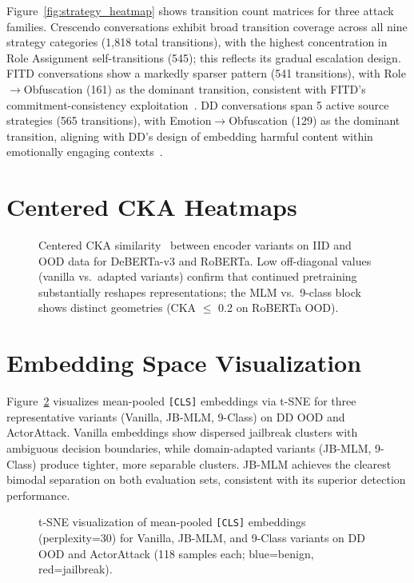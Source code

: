 Figure~\ref{fig:strategy_heatmap} shows transition count matrices for three attack families.
Crescendo conversations exhibit broad transition coverage across all nine strategy categories (1,818 total transitions), with the highest concentration in Role Assignment self-transitions (545); this reflects its gradual escalation design.
FITD conversations show a markedly sparser pattern (541 transitions), with Role$\to$Obfuscation (161) as the dominant transition, consistent with FITD's commitment-consistency exploitation~\citep{cialdini2001influence}.
DD conversations span 5 active source strategies (565 transitions), with Emotion$\to$Obfuscation (129) as the dominant transition, aligning with DD's design of embedding harmful content within emotionally engaging contexts~\citep{deceptivedelight2024}.

\section{Centered CKA Heatmaps}
\label{sec:cka_heatmap}

\begin{figure}[t]
\centering
\caption{Centered CKA similarity~\citep{kornblith2019cka} between encoder variants on IID and OOD data for DeBERTa-v3 and RoBERTa. Low off-diagonal values (vanilla vs.\ adapted variants) confirm that continued pretraining substantially reshapes representations; the MLM vs.\ 9-class block shows distinct geometries (CKA $\leq$ 0.2 on RoBERTa OOD).}
\label{fig:cka_heatmap}
\end{figure}

\section{Embedding Space Visualization}
\label{app:tsne}

Figure~\ref{fig:tsne} visualizes mean-pooled \texttt{[CLS]} embeddings via t-SNE for three representative variants (Vanilla, JB-MLM, 9-Class) on DD OOD and ActorAttack. Vanilla embeddings show dispersed jailbreak clusters with ambiguous decision boundaries, while domain-adapted variants (JB-MLM, 9-Class) produce tighter, more separable clusters. JB-MLM achieves the clearest bimodal separation on both evaluation sets, consistent with its superior detection performance.

\begin{figure}[ht]
\centering
\caption{t-SNE visualization of mean-pooled \texttt{[CLS]} embeddings (perplexity=30) for Vanilla, JB-MLM, and 9-Class variants on DD OOD and ActorAttack (118 samples each; blue=benign, red=jailbreak).}
\label{fig:tsne}
\end{figure}

